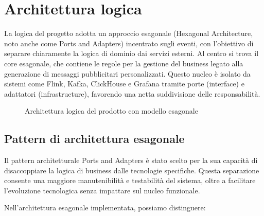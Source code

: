 \documentclass[10pt]{article}
\begin{document}
    \section{Architettura logica}

    La logica del progetto adotta un approccio esagonale (Hexagonal Architecture, noto anche come Ports and Adapters) incentrato sugli eventi, con l'obiettivo di separare chiaramente la logica di dominio dai servizi esterni. Al centro si trova il core esagonale, che contiene le regole per la gestione del business legato alla generazione di messaggi pubblicitari personalizzati. Questo nucleo è isolato da sistemi come Flink, Kafka, ClickHouse e Grafana tramite porte (interface) e adattatori (infrastructure), favorendo una netta suddivisione delle responsabilità.

    \begin{figure}[h]
    \centering
    \caption{Architettura logica del prodotto con modello esagonale}
    \end{figure}

    \subsection{Pattern di architettura esagonale}
    
    Il pattern architetturale Ports and Adapters è stato scelto per la sua capacità di disaccoppiare la logica di business dalle tecnologie specifiche. Questa separazione consente una maggiore manutenibilità e testabilità del sistema, oltre a facilitare l'evoluzione tecnologica senza impattare sul nucleo funzionale.
    
    Nell'architettura esagonale implementata, possiamo distinguere:
    
\end{document}
